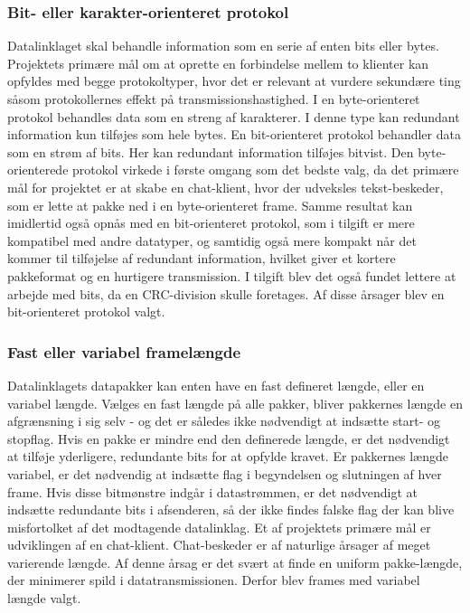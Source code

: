 \subsubsection{Bit- eller karakter-orienteret protokol}
Datalinklaget skal behandle information som en serie af enten bits eller bytes. Projektets primære mål om at oprette en forbindelse mellem to klienter kan opfyldes med begge protokoltyper, hvor det er relevant at vurdere sekundære ting såsom protokollernes effekt på transmissionshastighed.
I en byte-orienteret protokol behandles data som en streng af karakterer. I denne type kan redundant information kun tilføjes som hele bytes.
En bit-orienteret protokol behandler data som en strøm af bits. Her kan redundant information tilføjes bitvist. 
    Den byte-orienterede protokol virkede i første omgang som det bedste valg, da det primære mål for projektet er at skabe en chat-klient, hvor der udveksles tekst-beskeder, som er lette at pakke ned i en byte-orienteret frame. Samme resultat kan imidlertid også opnås med en bit-orienteret protokol, som i tilgift er mere kompatibel med andre datatyper, og samtidig også mere kompakt når det kommer til tilføjelse af redundant information, hvilket giver et kortere pakkeformat og en hurtigere transmission. I tilgift blev det også fundet lettere at arbejde med bits, da en CRC-division skulle foretages. Af disse årsager blev en bit-orienteret protokol valgt.

\subsubsection{Fast eller variabel framelængde}
Datalinklagets datapakker kan enten have en fast defineret længde, eller en variabel længde.
Vælges en fast længde på alle pakker, bliver pakkernes længde en afgrænsning i sig selv - og det er således ikke nødvendigt at indsætte start- og stopflag. Hvis en pakke er mindre end den definerede længde, er det nødvendigt at tilføje yderligere, redundante bits for at opfylde kravet.
Er pakkernes længde variabel, er det nødvendig at indsætte flag i begyndelsen og slutningen af hver frame. Hvis disse bitmønstre indgår i datastrømmen, er det nødvendigt at indsætte redundante bits i afsenderen, så der ikke findes falske flag der kan blive misfortolket af det modtagende datalinklag.
Et af projektets primære mål er udviklingen af en chat-klient. Chat-beskeder er af naturlige årsager af meget varierende længde. Af denne årsag er det svært at finde en uniform pakke-længde, der minimerer spild i datatransmissionen. Derfor blev frames med variabel længde valgt.

